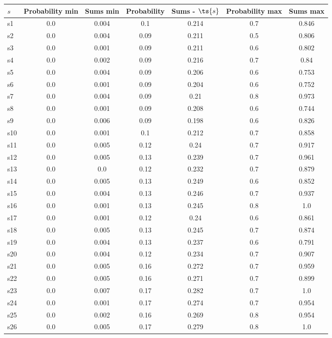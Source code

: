 \documentclass{article}
\begin{document}
\noindent\begin{tabular}{|l|c|c|c|c|c|c|}
\hline
$s$& Probability min & Sums min & Probability & Sums - $\ts{s}$ & Probability max & Sums max\\
\hline
s1 &0.0 & 0.004 & 0.1 & 0.214 & 0.7 & 0.846\\
\hline
s2 &0.0 & 0.004 & 0.09 & 0.211 & 0.5 & 0.806\\
\hline
s3 &0.0 & 0.001 & 0.09 & 0.211 & 0.6 & 0.802\\
\hline
s4 &0.0 & 0.002 & 0.09 & 0.216 & 0.7 & 0.84\\
\hline
s5 &0.0 & 0.004 & 0.09 & 0.206 & 0.6 & 0.753\\
\hline
s6 &0.0 & 0.001 & 0.09 & 0.204 & 0.6 & 0.752\\
\hline
s7 &0.0 & 0.004 & 0.09 & 0.21 & 0.8 & 0.973\\
\hline
s8 &0.0 & 0.001 & 0.09 & 0.208 & 0.6 & 0.744\\
\hline
s9 &0.0 & 0.006 & 0.09 & 0.198 & 0.6 & 0.826\\
\hline
s10 &0.0 & 0.001 & 0.1 & 0.212 & 0.7 & 0.858\\
\hline
s11 &0.0 & 0.005 & 0.12 & 0.24 & 0.7 & 0.917\\
\hline
s12 &0.0 & 0.005 & 0.13 & 0.239 & 0.7 & 0.961\\
\hline
s13 &0.0 & 0.0 & 0.12 & 0.232 & 0.7 & 0.879\\
\hline
s14 &0.0 & 0.005 & 0.13 & 0.249 & 0.6 & 0.852\\
\hline
s15 &0.0 & 0.004 & 0.13 & 0.246 & 0.7 & 0.937\\
\hline
s16 &0.0 & 0.001 & 0.13 & 0.245 & 0.8 & 1.0\\
\hline
s17 &0.0 & 0.001 & 0.12 & 0.24 & 0.6 & 0.861\\
\hline
s18 &0.0 & 0.005 & 0.13 & 0.245 & 0.7 & 0.874\\
\hline
s19 &0.0 & 0.004 & 0.13 & 0.237 & 0.6 & 0.791\\
\hline
s20 &0.0 & 0.004 & 0.12 & 0.234 & 0.7 & 0.907\\
\hline
s21 &0.0 & 0.005 & 0.16 & 0.272 & 0.7 & 0.959\\
\hline
s22 &0.0 & 0.005 & 0.16 & 0.271 & 0.7 & 0.899\\
\hline
s23 &0.0 & 0.007 & 0.17 & 0.282 & 0.7 & 1.0\\
\hline
s24 &0.0 & 0.001 & 0.17 & 0.274 & 0.7 & 0.954\\
\hline
s25 &0.0 & 0.002 & 0.16 & 0.269 & 0.8 & 0.954\\
\hline
s26 &0.0 & 0.005 & 0.17 & 0.279 & 0.8 & 1.0\\

\end{tabular}
\end{document}
